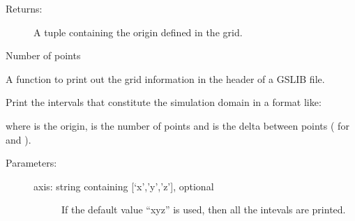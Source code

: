 \documentclass[letterpaper,10pt,english]{sphinxmanual}
\begin{document}
\begin{fulllineitems}
\begin{fulllineitems}
\begin{description}
\item[{Returns:}] \leavevmode
A tuple containing the origin defined in the grid.

\end{description}

\end{fulllineitems}


\begin{fulllineitems}
\label{\detokenize{appendices:s2Dcd.grid.Grid.points}}
Number of points

\end{fulllineitems}


\begin{fulllineitems}
\label{\detokenize{appendices:s2Dcd.grid.Grid.print4gslib}}
A function to print out the grid information in the header of
a GSLIB file.

\end{fulllineitems}


\begin{fulllineitems}
\label{\detokenize{appendices:s2Dcd.grid.Grid.print_intervals}}
Print the intervals that constitute the simulation domain in a
format like:

\begin{sphinxVerbatim}[commandchars=\\\{\}]
\PYG{p}{[}  \PYG{p}{]} \PYG{p}{[}  \PYG{p}{]} \PYG{p}{[}  \PYG{p}{]}
\end{sphinxVerbatim}

where  is the origin,  is the number of points and 
is the delta between points ( for  and ).
\begin{description}
\item[{Parameters:}] \leavevmode\begin{description}
\item[{axis: string containing {[}‘x’,’y’,’z’{]}, optional}] \leavevmode
If the default value “xyz” is used, then all the intevals
are printed.


\end{description}
\end{description}
\end{fulllineitems}
\end{fulllineitems}
\end{document}

